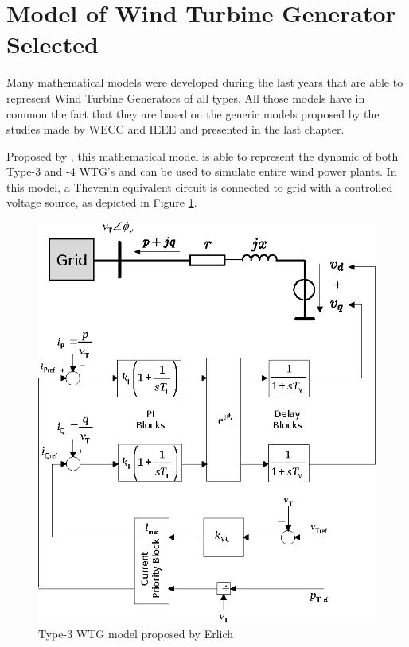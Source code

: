 \section{Model of Wind Turbine Generator Selected}

Many mathematical models were developed during the last years that are able to represent Wind Turbine Generators of all types. All those models have in common the fact that they are based on the generic models proposed by the studies made by WECC and IEEE and presented in the last chapter.

Proposed by \cite{Erlich2012}, this mathematical model is able to represent the dynamic of both Type-3 and -4 WTG's and can be used to simulate entire wind power plants. In this model, a Thevenin equivalent circuit is connected to grid with a controlled voltage source, as depicted in Figure \ref{fig: ErlMod}. 

\begin{figure}[h]
	\caption{Type-3 WTG model proposed by Erlich}
	\begin{center}
		\includegraphics[scale=1]{Images/ErlichModel.eps}
	\end{center}
	\label{fig: ErlMod}
\end{figure}

